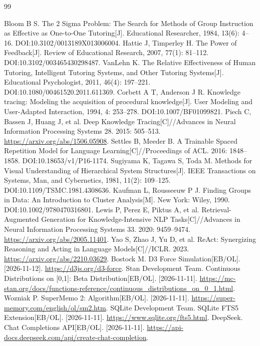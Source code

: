 \documentclass[UTF8,zihao=-4,fontset=none,a4paper]{ctexart}
\begin{document}
\begin{thebibliography}{99}\setlength{\itemsep}{4pt}
Bloom B S. The 2 Sigma Problem: The Search for Methods of Group Instruction as Effective as One-to-One Tutoring[J]. Educational Researcher, 1984, 13(6): 4--16. DOI:10.3102/0013189X013006004.
Hattie J, Timperley H. The Power of Feedback[J]. Review of Educational Research, 2007, 77(1): 81--112. DOI:10.3102/003465430298487.
VanLehn K. The Relative Effectiveness of Human Tutoring, Intelligent Tutoring Systems, and Other Tutoring Systems[J]. Educational Psychologist, 2011, 46(4): 197--221. DOI:10.1080/00461520.2011.611369.
Corbett A T, Anderson J R. Knowledge tracing: Modeling the acquisition of procedural knowledge[J]. User Modeling and User-Adapted Interaction, 1994, 4: 253--278. DOI:10.1007/BF01099821.
Piech C, Bassen J, Huang J, et al. Deep Knowledge Tracing[C]//Advances in Neural Information Processing Systems 28. 2015: 505--513. \url{https://arxiv.org/abs/1506.05908}.
Settles B, Meeder B. A Trainable Spaced Repetition Model for Language Learning[C]//Proceedings of ACL. 2016: 1848--1858. DOI:10.18653/v1/P16-1174.
Sugiyama K, Tagawa S, Toda M. Methods for Visual Understanding of Hierarchical System Structures[J]. IEEE Transactions on Systems, Man, and Cybernetics, 1981, 11(2): 109--125. DOI:10.1109/TSMC.1981.4308636.
Kaufman L, Rousseeuw P J. Finding Groups in Data: An Introduction to Cluster Analysis[M]. New York: Wiley, 1990. DOI:10.1002/9780470316801.
Lewis P, Perez E, Piktus A, et al. Retrieval-Augmented Generation for Knowledge-Intensive NLP Tasks[C]//Advances in Neural Information Processing Systems 33. 2020: 9459--9474. \url{https://arxiv.org/abs/2005.11401}.
Yao S, Zhao J, Yu D, et al. ReAct: Synergizing Reasoning and Acting in Language Models[C]//ICLR. 2023. \url{https://arxiv.org/abs/2210.03629}.
Bostock M. D3 Force Simulation[EB/OL]. [2026-11-12]. \url{https://d3js.org/d3-force}.
Stan Development Team. Continuous Distributions on [0,1]: Beta Distribution[EB/OL]. [2026-11-11]. \url{https://mc-stan.org/docs/functions-reference/continuous_distributions_on_0_1.html}.
Wozniak P. SuperMemo 2: Algorithm[EB/OL]. [2026-11-11]. \url{https://super-memory.com/english/ol/sm2.htm}.
SQLite Development Team. SQLite FTS5 Extension[EB/OL]. [2026-11-11]. \url{https://www.sqlite.org/fts5.html}.
DeepSeek. Chat Completions API[EB/OL]. [2026-11-11]. \url{https://api-docs.deepseek.com/api/create-chat-completion}.

\end{thebibliography}
\end{document}
